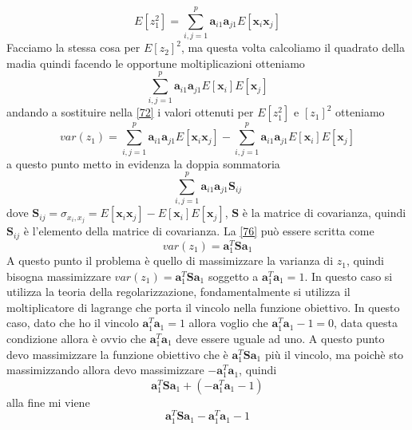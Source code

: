 \begin{equation}
E[z_1^2] = \sum_{i,j=1}^p \mathbf{a}_{i1} \mathbf{a}_{j1} E[\mathbf{x}_i \mathbf{x}_j]
\end{equation}
Facciamo la stessa cosa per $E[z_2]^2$, ma questa volta calcoliamo il quadrato della madia quindi facendo le opportune moltiplicazioni otteniamo
\begin{equation}
\sum_{i,j=1}^p \mathbf{a}_{i1} \mathbf{a}_{j1} E[\mathbf{x}_i] E[\mathbf{x}_j]
\end{equation}
andando a sostituire nella \ref{72} i valori ottenuti per $E[z_1^2]$ e $[z_1]^2$ otteniamo
\begin{equation}
var(z_1) = \sum_{i,j=1}^p \mathbf{a}_{i1} \mathbf{a}_{j1} E[\mathbf{x}_i \mathbf{x}_j] - \sum_{i,j=1}^p \mathbf{a}_{i1} \mathbf{a}_{j1} E[\mathbf{x}_i] E[\mathbf{x}_j]
\end{equation}
a questo punto metto in evidenza la doppia sommatoria
\begin{equation}\label{76}
\sum_{i,j=1}^p \mathbf{a}_{i1} \mathbf{a}_{j1} \mathbf{S}_{ij} 
\end{equation}
dove $\mathbf{S}_{ij} = \sigma_{x_i,x_j}= E[\mathbf{x}_i \mathbf{x}_j] - E[\mathbf{x}_i] E[\mathbf{x}_j]$, $\mathbf{S}$ è la matrice di covarianza, quindi $\mathbf{S}_{ij}$ è l'elemento della matrice di covarianza. 
La \ref{76} può essere scritta come 
\begin{equation}
var(z_1) = \mathbf{a}_1^T \mathbf{S}\mathbf{a}_1
\end{equation}
A questo punto il problema è quello di massimizzare la varianza di $z_1$, quindi bisogna massimizzare  $var(z_1) = \mathbf{a}_1^T \mathbf{S}\mathbf{a}_1$ soggetto a $\mathbf{a}_1^T \mathbf{a}_1  = 1$. In questo caso si utilizza la teoria della regolarizzazione, fondamentalmente si utilizza il moltiplicatore di lagrange che porta il vincolo nella funzione obiettivo. In questo caso, dato che ho il vincolo $\mathbf{a}_1^T \mathbf{a}_1  = 1$ allora voglio che $\mathbf{a}_1^T \mathbf{a}_1  -1= 0$, data questa condizione allora è ovvio che $\mathbf{a}_1^T \mathbf{a}_1$ deve essere uguale ad uno. A questo punto devo massimizzare la funzione obiettivo che è  $\mathbf{a}_1^T \mathbf{S}\mathbf{a}_1$ più il vincolo,  ma poichè sto massimizzando allora devo massimizzare $-\mathbf{a}_1^T \mathbf{a}_1$, quindi
\begin{equation}
\mathbf{a}_1^T \mathbf{S}\mathbf{a}_1 + ( - \mathbf{a}_1^T \mathbf{a}_1  - 1)
\end{equation}
alla fine mi viene 
\begin{equation}
\mathbf{a}_1^T \mathbf{S}\mathbf{a}_1 - \mathbf{a}_1^T \mathbf{a}_1  -1 
\end{equation}
